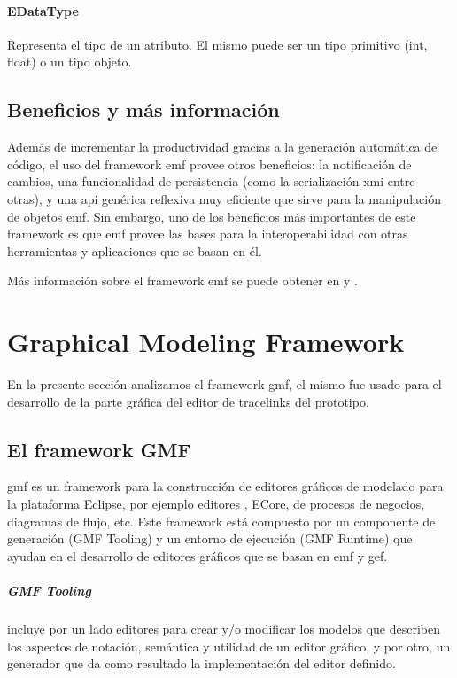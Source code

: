 \documentclass[a4paper,12pt,oneside,spanish]{book}
\begin{document}
\paragraph{EDataType} Representa el tipo de un atributo. El mismo puede ser un tipo primitivo (int, float) o un tipo objeto.


\subsection{Beneficios y más información}

Además de incrementar la productividad gracias a la generación automática de código, el uso del framework \gls{emf} provee otros beneficios: la notificación de cambios, una funcionalidad de persistencia (como la serialización \gls{xmi} entre otras), y una \gls{api} genérica reflexiva muy eficiente que sirve para la manipulación de objetos \gls{emf}. Sin embargo, uno de los beneficios más importantes de este framework es que \gls{emf} provee las bases para la interoperabilidad con otras herramientas y aplicaciones que se basan en él. 

Más información sobre el framework \gls{emf} se puede obtener en \cite{EMF} y \cite{EMFADG}.


\section{Graphical Modeling Framework}

En la presente sección analizamos el framework \gls{gmf}, el mismo fue usado para el desarrollo de la parte gráfica del editor de tracelinks del prototipo.

\subsection{El framework GMF}

\gls{gmf} es un framework para la construcción de editores gráficos de modelado para la plataforma Eclipse, por ejemplo editores , ECore, de procesos de negocios, diagramas de flujo, etc. Este framework está compuesto por un componente de generación (GMF Tooling) y un entorno de ejecución (GMF Runtime) que ayudan en el desarrollo de editores gráficos que se basan en \gls{emf} y \gls{gef}.

\subparagraph{GMF Tooling} incluye por un lado editores para crear y/o modificar los modelos que describen los aspectos de notación, semántica y utilidad de un editor gráfico, y por otro, un generador que da como resultado la implementación del editor definido.
\end{document}
